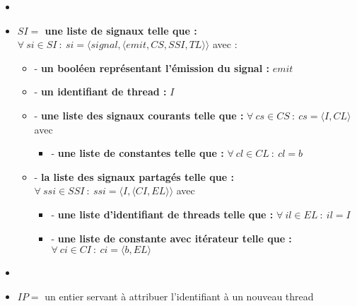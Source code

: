 \documentclass[10pt,a4paper]{report}
\begin{document}
\begin{itemize}
\item[]
\item[] \textbf{$SI =$ une liste de signaux telle que :} $\forall~si \in SI~:~si = \langle signal,\langle emit,CS,SSI,TL\rangle\rangle$ avec :
  \begin{itemize}
  \item[] - \textbf{un booléen représentant l'émission du signal :} $emit$
  \item[] - \textbf{un identifiant de thread :} $I$
  \item[] - \textbf{une liste des signaux courants telle que :} $\forall~cs \in CS~:~cs = \langle I,CL\rangle$ avec 
    \begin{itemize}
    \item[] - \textbf{une liste de constantes telle que :} $\forall~cl \in CL~:~cl = b$
    \end{itemize}
    
  \item[] - \textbf{la liste des signaux partagés telle que :} $\forall~ssi \in SSI~:~ssi = \langle I,\langle CI,EL\rangle\rangle$ avec 
    \begin{itemize}
    \item[] - \textbf{une liste d'identifiant de threads telle que :} $\forall~il \in EL~:~il = I$
    \item[] - \textbf{une liste de constante avec itérateur telle que :} $\forall~ci \in CI~:~ci = \langle b, EL\rangle$
    \end{itemize}
  \end{itemize}
\item[]
\item[] $IP =$ un entier servant à attribuer l'identifiant à un nouveau thread 
\end{itemize}
\bigbreak
\end{document}

